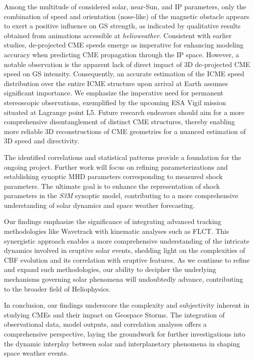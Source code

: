 Among the multitude of considered solar, near-Sun, and IP parameters, only the combination of speed and orientation (nose-like) of the magnetic obstacle appears to exert a positive influence on GS strength, as indicated by qualitative results obtained from animations accessible at \textit{helioweather}. Consistent with earlier studies, de-projected CME speeds emerge as imperative for enhancing modeling accuracy when predicting CME propagation through the IP space. However, a notable observation is the apparent lack of direct impact of 3D de-projected CME speed on GS intensity. Consequently, an accurate estimation of the ICME speed distribution over the entire ICME structure upon arrival at Earth assumes significant importance. We emphasize the imperative need for permanent stereoscopic observations, exemplified by the upcoming ESA Vigil mission situated at Lagrange point L5. Future research endeavors should aim for a more comprehensive disentanglement of distinct CME structures, thereby enabling more reliable 3D reconstructions of CME geometries for a nuanced estimation of 3D speed and directivity.

The identified correlations and statistical patterns provide a foundation for the ongoing project. Further work will focus on refining parameterizations and establishing synoptic MHD parameters corresponding to measured shock parameters. The ultimate goal is to enhance the representation of shock parameters in the \textit{S3M} synoptic model, contributing to a more comprehensive understanding of solar dynamics and space weather forecasting.

Our findings emphasize the significance of integrating advanced tracking methodologies like Wavetrack with kinematic analyses such as FLCT. This synergistic approach enables a more comprehensive understanding of the intricate dynamics involved in eruptive solar events, shedding light on the complexities of CBF evolution and its correlation with eruptive features. As we continue to refine and expand such methodologies, our ability to decipher the underlying mechanisms governing solar phenomena will undoubtedly advance, contributing to the broader field of Heliophysics.

In conclusion, our findings underscore the complexity and subjectivity inherent in studying CMEs and their impact on Geospace Storms. The integration of observational data, model outputs, and correlation analyses offers a comprehensive perspective, laying the groundwork for further investigations into the dynamic interplay between solar and interplanetary phenomena in shaping space weather events.
